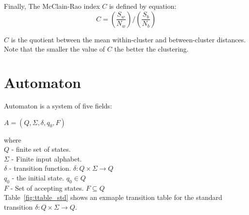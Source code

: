 \documentclass{mini}
\begin{document}
Finally, The McClain-Rao index $C$ is defined by equation: 
\begin{equation}
    C =  (\frac{S_w}{N_w}) / (\frac{S_b}{N_b})
\end{equation}

$C$ is the quotient between the mean within-cluster and between-cluster distances.
Note that the smaller the value of $C$ the better the clustering.

\section{Automaton} \label{sec:autom}
Automaton is a system of five fields:
\begin{center}
    $A = (Q, \Sigma, \delta, q_0, F)$
\end{center}

where \\
$Q$ - finite set of states. \\
$\Sigma$ - Finite input alphabet. \\
$\delta$ - transition function. $\delta: Q \times \Sigma \rightarrow Q$ \\
$q_0$ - the initial state. $q_0 \in Q$ \\
$F$ - Set of accepting states. $F \subseteq Q$ \\

Table~\ref{fig:ttable_std} shows an exmaple transition table for the standard transition $\delta: Q \times \Sigma \rightarrow Q$.
\end{document}
